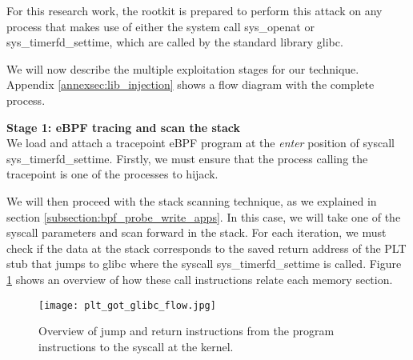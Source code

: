For this research work, the rootkit is prepared to perform this attack on any process that makes use of either the system call sys\_openat or sys\_timerfd\_settime, which are called by the standard library glibc.

We will now describe the multiple exploitation stages for our technique. Appendix \ref{annexsec:lib_injection} shows a flow diagram with the complete process.


\textbf{Stage 1: eBPF tracing and scan the stack}\\
We load and attach a tracepoint eBPF program at the \textit{enter} position of syscall sys\_timerfd\_settime. Firstly, we must ensure that the process calling the tracepoint is one of the processes to hijack.

We will then proceed with the stack scanning technique, as we explained in section \ref{subsection:bpf_probe_write_apps}. In this case, we will take one of the syscall parameters and scan forward in the stack. For each iteration, we must check if the data at the stack corresponds to the saved return address of the PLT stub that jumps to glibc where the syscall sys\_timerfd\_settime is called. Figure \ref{fig:lib_stage1} shows an overview of how these call instructions relate each memory section. 


\begin{figure}[htbp]
	\centering
	\texttt{[image: plt\_got\_glibc\_flow.jpg]}
	\caption{Overview of jump and return instructions from the program instructions to the syscall at the kernel.}
	\label{fig:lib_stage1}
\end{figure}

